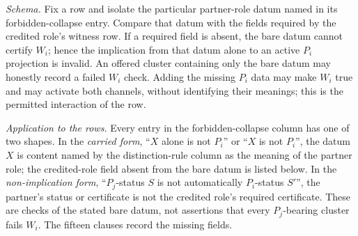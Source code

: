 \documentclass[11pt]{article}
\theoremstyle{definition}
\begin{document}
\emph{Schema.} Fix a row and isolate the particular partner-role datum named
in its forbidden-collapse entry. Compare that datum with the fields required
by the credited role's witness row. If a required field is absent, the bare
datum cannot certify \(W_i\); hence the implication from that datum alone to
an active \(P_i\) projection is invalid. An offered cluster containing only the
bare datum may honestly record a failed \(W_i\) check. Adding the missing
\(P_i\) data may make \(W_i\) true and may activate both channels, without
identifying their meanings; this is the permitted interaction of the row.

\emph{Application to the rows.} Every entry in the forbidden-collapse column
has one of two shapes. In the \emph{carried form}, ``\(X\) alone is not
\(P_i\)'' or ``\(X\) is not \(P_i\)'', the datum \(X\) is content named by the
distinction-rule column as the meaning of the partner role; the credited-role
field absent from the bare datum is listed below. In the
\emph{non-implication form}, ``\(P_j\)-status \(S\) is not automatically
\(P_i\)-status \(S'\)'', the partner's status or certificate is not the
credited role's required certificate. These are checks of the stated bare
datum, not assertions that every \(P_j\)-bearing cluster fails \(W_i\). The
fifteen clauses record the missing fields.
\end{document}
